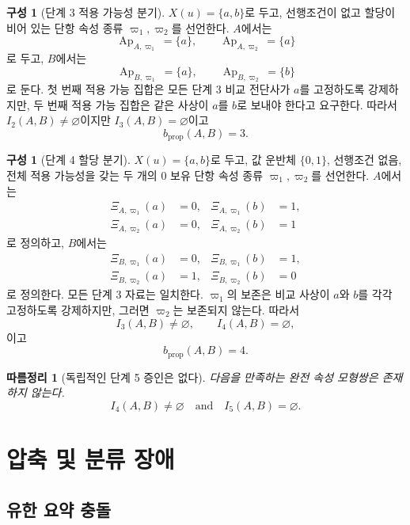 \documentclass[11pt]{article}
\newcommand{\Ap}{\operatorname{Ap}}
\newtheorem{corollary}[theorem]{따름정리}
\theoremstyle{definition}
\newtheorem{construction}[theorem]{구성}
\theoremstyle{remark}
\begin{document}
\begin{construction}[단계 3 적용 가능성 분기]
\(X(u)=\{a,b\}\)로 두고, 선행조건이 없고 할당이 비어 있는 단항 속성 종류 \(\varpi_1,\varpi_2\)를 선언한다.
\(A\)에서는
\[
\Ap_{A,\varpi_1}=\{a\},
\qquad
\Ap_{A,\varpi_2}=\{a\}
\]
로 두고, \(B\)에서는
\[
\Ap_{B,\varpi_1}=\{a\},
\qquad
\Ap_{B,\varpi_2}=\{b\}
\]
로 둔다.
첫 번째 적용 가능 집합은 모든 단계 3 비교 전단사가 \(a\)를 고정하도록 강제하지만, 두 번째 적용 가능 집합은 같은 사상이 \(a\)를 \(b\)로 보내야 한다고 요구한다.
따라서 \(I_2(A,B)\neq\varnothing\)이지만 \(I_3(A,B)=\varnothing\)이고
\[
b_{\mathrm{prop}}(A,B)=3.
\]
\end{construction}

\begin{construction}[단계 4 할당 분기]
\(X(u)=\{a,b\}\)로 두고, 값 운반체 \(\{0,1\}\), 선행조건 없음, 전체 적용 가능성을 갖는 두 개의 0 보유 단항 속성 종류 \(\varpi_1,\varpi_2\)를 선언한다.
\(A\)에서는
\[
\begin{aligned}
\Xi_{A,\varpi_1}(a)&=0,&\Xi_{A,\varpi_1}(b)&=1,\\
\Xi_{A,\varpi_2}(a)&=0,&\Xi_{A,\varpi_2}(b)&=1
\end{aligned}
\]
로 정의하고, \(B\)에서는
\[
\begin{aligned}
\Xi_{B,\varpi_1}(a)&=0,&\Xi_{B,\varpi_1}(b)&=1,\\
\Xi_{B,\varpi_2}(a)&=1,&\Xi_{B,\varpi_2}(b)&=0
\end{aligned}
\]
로 정의한다.
모든 단계 3 자료는 일치한다.
\(\varpi_1\)의 보존은 비교 사상이 \(a\)와 \(b\)를 각각 고정하도록 강제하지만, 그러면 \(\varpi_2\)는 보존되지 않는다.
따라서
\[
I_3(A,B)\neq\varnothing,
\qquad
I_4(A,B)=\varnothing,
\]
이고
\[
b_{\mathrm{prop}}(A,B)=4.
\]
\end{construction}

\begin{corollary}[독립적인 단계 5 증인은 없다]
다음을 만족하는 완전 속성 모형쌍은 존재하지 않는다.
\[
I_4(A,B)\neq\varnothing
\quad\text{and}\quad
I_5(A,B)=\varnothing.
\]
\end{corollary}

\section{압축 및 분류 장애}
\label{sec:compression}

\subsection{유한 요약 충돌}
\end{document}
